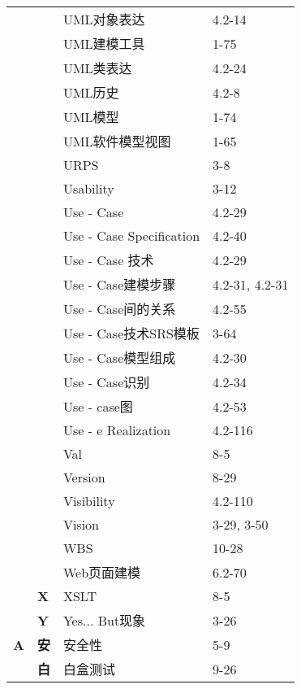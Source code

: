 \documentclass[twocolumn]{article}
\begin{document}
\begin{tabular}{ | >{\bfseries}m{0.5em} | >{\bfseries}m{1em} | m{12em} | m{8em} |}
 &  & UML对象表达 & 4.2-14\\ \cline{3-4}
 &  & UML建模工具 & 1-75\\ \cline{3-4}
 &  & UML类表达 & 4.2-24\\ \cline{3-4}
 &  & UML历史 & 4.2-8\\ \cline{3-4}
 &  & UML模型 & 1-74\\ \cline{3-4}
 &  & UML软件模型视图 & 1-65\\ \cline{3-4}
 &  & URPS & 3-8\\ \cline{3-4}
 &  & Usability & 3-12\\ \cline{3-4}
 &  & Use - Case & 4.2-29\\ \cline{3-4}
 &  & Use - Case Specification & 4.2-40\\ \cline{3-4}
 &  & Use - Case 技术 & 4.2-29\\ \cline{3-4}
 &  & Use - Case建模步骤 & 4.2-31, 4.2-31\\ \cline{3-4}
 &  & Use - Case间的关系 & 4.2-55\\ \cline{3-4}
 &  & Use - Case技术SRS模板 & 3-64\\ \cline{3-4}
 &  & Use - Case模型组成 & 4.2-30\\ \cline{3-4}
 &  & Use - Case识别 & 4.2-34\\ \cline{3-4}
 &  & Use - case图 & 4.2-53\\ \cline{3-4}
 &  & Use - e Realization & 4.2-116\\ \cline{2-4}
 & \multirow{4}{1em}{V} & Val & 8-5\\ \cline{3-4}
 &  & Version & 8-29\\ \cline{3-4}
 &  & Visibility & 4.2-110\\ \cline{3-4}
 &  & Vision & 3-29, 3-50\\ \cline{2-4}
 & \multirow{2}{1em}{W} & WBS & 10-28\\ \cline{3-4}
 &  & Web页面建模 & 6.2-70\\ \cline{2-4}
 & X & XSLT & 8-5\\ \cline{2-4}
 & Y & Yes... But现象 & 3-26\\ \cline{1-4}
A & 安 & 安全性 & 5-9\\ \cline{1-4}
\multirow{19}{0.5em}{B \newline  \newline  \newline  \newline  \newline B \newline  \newline  \newline  \newline  \newline B \newline  \newline  \newline  \newline  \newline B} & 白 & 白盒测试 & 9-26\\ \cline{2-4}

\end{tabular}
\end{document}
